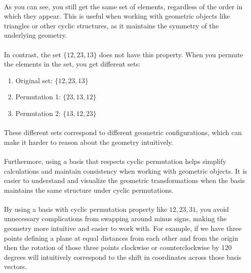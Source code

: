 \documentclass{article}
\begin{document}
\begin{enumerate}
    \paragraph{}
        As you can see, you still get the same set of elements, regardless of the order in which they appear. 
        This is useful when working with geometric objects like triangles or other cyclic structures, 
        as it maintains the symmetry of the underlying geometry.
    \paragraph{}
        In contrast, the set $\{12, 23, 13\}$ does not have this property. When you permute the elements in the set, 
        you get different sets:
        \begin{enumerate}
            \item Original set: $\{12, 23, 13\}$
            \item Permutation 1: $\{23, 13, 12\}$
            \item Permutation 2: $\{13, 12, 23\}$
        \end{enumerate}
        
    \paragraph{}
        These different sets correspond to different geometric configurations, which can make it harder to reason about the 
        geometry intuitively.
    \paragraph{}
        Furthermore, using a basis that respects cyclic permutation helps simplify calculations and maintain consistency 
        when working with geometric objects. It is easier to understand and visualize the geometric transformations when 
        the basis maintains the same structure under cyclic permutations.
    \paragraph{}
        By using a basis with cyclic permutation property like ${12, 23, 31}$, you avoid unnecessary complications from 
        swapping around minus signs, making the geometry more intuitive and easier to work with. For example, if we have 
        three points defining a plane at equal distances from each other and from the origin then the rotation of those 
        three points clockwise or counterclockwise by 120 degrees will intuitively correspond to the shift in coordinates 
        across those basis vectors.

\end{enumerate}
\end{document}
